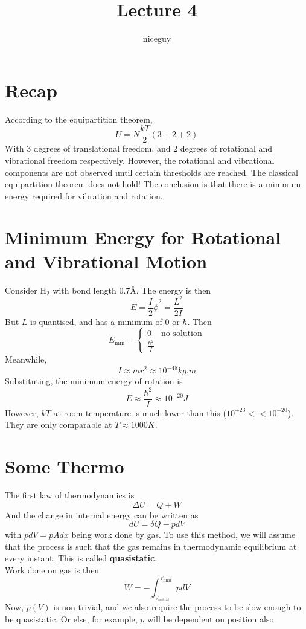 \documentclass[12pt]{article}
\author{niceguy}
\title{Lecture 4}
\begin{document}
\maketitle

\section{Recap}

According to the equipartition theorem,
$$U = N\frac{kT}{2}(3+2+2)$$
With 3 degrees of translational freedom, and 2 degrees of rotational and vibrational freedom respectively. However, the rotational and vibrational components are not observed until certain thresholds are reached. The classical equipartition theorem does not hold! The conclusion is that there is a minimum energy required for vibration and rotation.

\section{Minimum Energy for Rotational and Vibrational Motion}

Consider H$_2$ with bond length 0.7\AA. The energy is then
$$E = \frac{I}{2}\dot{\phi}^2 = \frac{L^2}{2I}$$
But $L$ is quantised, and has a minimum of 0 or $\hbar$. Then
$$E_\text{min} = \begin{cases} 0 & \text{no solution} \\ \frac{\hbar^2}{I} & \end{cases}$$
Meanwhile,
$$I \approx mr^2 \approx 10^{-48} \unit{kg.m}$$
Substituting, the minimum energy of rotation is
$$E \approx \frac{\hbar^2}{I} \approx 10^{-20} \unit{J}$$
However, $kT$ at room temperature is much lower than this ($10^{-23} << 10^{-20}$). They are only comparable at $T \approx 1000 \unit{K}$.

\section{Some Thermo}

The first law of thermodynamics is
$$\Delta U = Q + W$$
And the change in internal energy can be written as
$$dU = \delta Q - pdV$$
with $pdV = pAdx$ being work done by gas. To use this method, we will assume that the process is such that the gas remains in thermodynamic equilibrium at every instant. This is called \textbf{quasistatic}. \\
Work done on gas is then
$$W = -\int_{V_\text{initial}}^{V_\text{final}} pdV$$
Now, $p(V)$ is non trivial, and we also require the process to be slow enough to be quasistatic. Or else, for example, $p$ will be dependent on position also.
\end{document}
